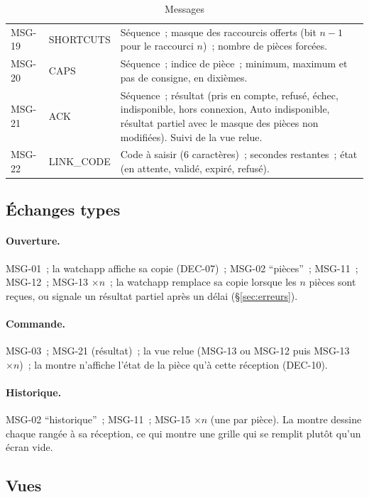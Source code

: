 \begin{table}[H]
\begin{tabularx}{\linewidth}{@{}l>{\raggedright\arraybackslash}p{23mm}X@{}}
    MSG-19 & SHORTCUTS & Séquence~; masque des raccourcis offerts (bit $n-1$ pour le raccourci $n$)~; nombre de pièces forcées. \\
    MSG-20 & CAPS & Séquence~; indice de pièce~; minimum, maximum et pas de consigne, en dixièmes. \\
    MSG-21 & ACK & Séquence~; résultat (pris en compte, refusé, échec, indisponible, hors connexion, Auto indisponible, résultat partiel avec le masque des pièces non modifiées). Suivi de la vue relue. \\
    MSG-22 & LINK\_CODE & Code à saisir (6 caractères)~; secondes restantes~; état (en attente, validé, expiré, refusé). \\
    \bottomrule
  \end{tabularx}
  \caption{Messages}
\end{table}

\subsection{Échanges types}

\paragraph{Ouverture.} MSG-01~; la watchapp affiche sa copie (DEC-07)~; MSG-02 \enquote{pièces}~;
MSG-11~; MSG-12~; MSG-13 $\times n$~; la watchapp remplace sa copie lorsque les $n$ pièces sont
reçues, ou signale un résultat partiel après un délai (§\ref{sec:erreurs}).

\paragraph{Commande.} MSG-03~; MSG-21 (résultat)~; la vue relue (MSG-13 ou MSG-12 puis MSG-13 $\times n$)~;
la montre n'affiche l'état de la pièce qu'à cette réception (DEC-10).

\paragraph{Historique.} MSG-02 \enquote{historique}~; MSG-11~; MSG-15 $\times n$ (une par pièce). La montre
dessine chaque rangée à sa réception, ce qui montre une grille qui se remplit plutôt qu'un
écran vide.

\subsection{Vues}

